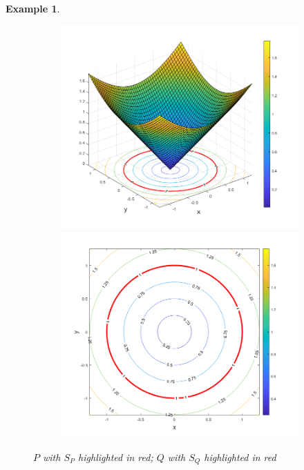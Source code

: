 \documentclass[11pt]{article}
\newtheorem{example}{Example}
\begin{document}
\begin{example}
\begin{figure}[!htb]
    \hspace{-20pt}
    \begin{subfigure}{0.5\textwidth}
    \centering
    \includegraphics[scale=0.4]{Q_and_levelsets.png}
    \vspace{-10pt}
    \includegraphics[scale=0.4]{Q_levelsets.png}
    \end{subfigure}
    \caption{$P$ with $S_P$ highlighted in red; $Q$ with $S_Q$ highlighted in red }
    \label{fig:Weierstrass}
\end{figure}

\end{example}
\end{document}
